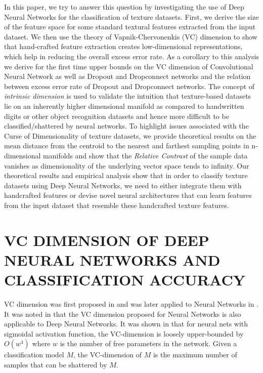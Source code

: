 \documentclass[11pt,a4paper]{article}
\begin{document}
In this paper, we try to answer this question by investigating the use of Deep Neural Networks for the classification of texture datasets. First, we derive the size of the feature space for some standard textural features extracted from the input dataset. We then use the theory of Vapnik-Chervonenkis (VC) dimension to show that hand-crafted feature extraction creates low-dimensional representations, which help in reducing the overall excess error rate. As a corollary to this analysis we derive for the first time upper bounds on the VC dimension of Convolutional Neural Network as well as Dropout and Dropconnect networks and the relation between excess error rate of Dropout and Dropconnect networks. The concept of \emph{intrinsic dimension} is used to validate the intuition that texture-based datasets lie on an inherently higher dimensional manifold as compared to handwritten digits or other object recognition datasets and hence more difficult to be classified/shattered by neural networks. To highlight issues associated with the Curse of Dimensionality of texture datasets, we provide theoretical results on the mean distance from the centroid to the nearest and farthest sampling points in n-dimensional manifolds and show that the \emph{Relative Contrast} of the sample data vanishes as dimensionality of the underlying vector space tends to infinity. Our theoretical results and empirical analysis show that in order to classify texture datasets using Deep Neural Networks, we need to either integrate them with handcrafted features or devise novel neural architectures that can learn features from the input dataset that resemble these handcrafted texture features.  

\section{VC DIMENSION OF DEEP NEURAL NETWORKS AND CLASSIFICATION ACCURACY}\label{vc_dim_and_accuracy}

VC dimension was first proposed in \cite{vapnik:264} and was later applied to Neural Networks in \cite{Bartlett_vapnik-chervonenkisdimension}. It was noted in \cite{BianchiniS14} that the VC dimension proposed for Neural Networks is also applicable to Deep Neural Networks. It was shown in \cite{Bartlett_vapnik-chervonenkisdimension} that for neural nets with sigmoidal activation function, the VC-dimension is loosely upper-bounded by $O(w^4)$ where $w$ is the number of free parameters in the network. Given a classification model $M$, the VC-dimension of $M$ is the maximum number of samples that can be shattered by $M$.
\end{document}
